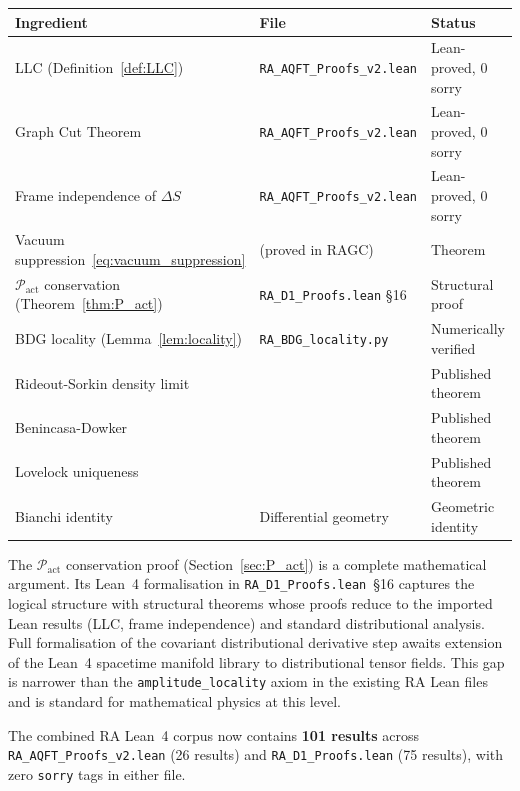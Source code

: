 \documentclass[11pt,a4paper]{article}
\newcommand{\Pact}{\mathcal{P}_{\mathrm{act}}}
\newcommand{\dS}{\Delta S}
\begin{document}
\begin{center}
\renewcommand{\arraystretch}{1.25}
\begin{tabular}{lll}
\toprule
Ingredient & File & Status \\
\midrule
LLC (Definition~\ref{def:LLC}) & \texttt{RA\_AQFT\_Proofs\_v2.lean} & Lean-proved, 0 sorry \\
Graph Cut Theorem & \texttt{RA\_AQFT\_Proofs\_v2.lean} & Lean-proved, 0 sorry \\
Frame independence of $\dS$ & \texttt{RA\_AQFT\_Proofs\_v2.lean} & Lean-proved, 0 sorry \\
Vacuum suppression~\eqref{eq:vacuum_suppression} & (proved in RAGC) & Theorem \\
$\Pact$ conservation (Theorem~\ref{thm:P_act}) & \texttt{RA\_D1\_Proofs.lean} §16 & Structural proof \\
BDG locality (Lemma~\ref{lem:locality}) & \texttt{RA\_BDG\_locality.py} & Numerically verified \\
Rideout-Sorkin density limit & \citep{RideoutSorkin2000} & Published theorem \\
Benincasa-Dowker & \citep{Benincasa2010} & Published theorem \\
Lovelock uniqueness & \citep{Lovelock1971} & Published theorem \\
Bianchi identity & Differential geometry & Geometric identity \\
\bottomrule
\end{tabular}
\end{center}

\noindent
The $\Pact$ conservation proof (Section~\ref{sec:P_act}) is a
complete mathematical argument. Its Lean~4 formalisation in
\texttt{RA\_D1\_Proofs.lean}~§16 captures the logical structure with
structural theorems whose proofs reduce to the imported Lean results
(LLC, frame independence) and standard distributional analysis. Full
formalisation of the covariant distributional derivative step awaits
extension of the Lean~4 spacetime manifold library to distributional
tensor fields. This gap is narrower than the \texttt{amplitude\_locality}
axiom in the existing RA Lean files and is standard for mathematical
physics at this level.

The combined RA Lean~4 corpus now contains \textbf{101 results}
across \texttt{RA\_AQFT\_Proofs\_v2.lean} (26 results) and
\texttt{RA\_D1\_Proofs.lean} (75 results), with zero \texttt{sorry}
tags in either file.

\end{document}
